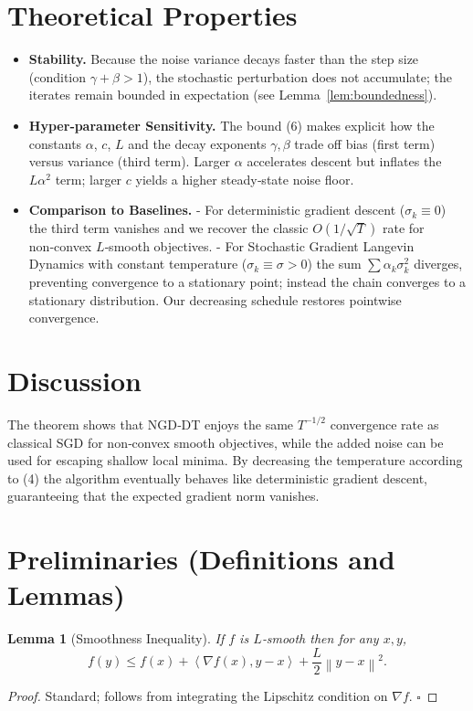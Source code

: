 \documentclass[11pt]{article}
\newtheorem{lemma}{Lemma}
\newcommand{\norm}[1]{\left\|#1\right\|}
\newcommand{\ip}[2]{\left\langle #1,#2\right\rangle}
\begin{document}
\section*{Theoretical Properties}
\begin{itemize}
\item \textbf{Stability.}  Because the noise variance decays faster than the
step size (condition $\gamma+\beta>1$), the stochastic perturbation
does not accumulate; the iterates remain bounded in expectation
(see Lemma~\ref{lem:boundedness}).

\item \textbf{Hyper‑parameter Sensitivity.}
  The bound (6) makes explicit how the constants $\alpha$, $c$, $L$ and
  the decay exponents $\gamma,\beta$ trade off bias (first term) versus
  variance (third term).  Larger $\alpha$ accelerates descent but
  inflates the $L\alpha^2$ term; larger $c$ yields a higher steady‑state
  noise floor.

\item \textbf{Comparison to Baselines.}
  - For deterministic gradient descent ($\sigma_k\equiv0$) the third term
    vanishes and we recover the classic $O(1/\sqrt{T})$ rate for
    non‑convex $L$‑smooth objectives.  
  - For Stochastic Gradient Langevin Dynamics with constant temperature
    ($\sigma_k\equiv\sigma>0$) the sum $\sum\alpha_k\sigma_k^2$ diverges,
    preventing convergence to a stationary point; instead the chain
    converges to a stationary distribution.  Our decreasing schedule
    restores pointwise convergence.

\end{itemize}

\section*{Discussion}
The theorem shows that NGD‑DT enjoys the same $T^{-1/2}$ convergence
rate as classical SGD for non‑convex smooth objectives, while the
added noise can be used for escaping shallow local minima.  By
decreasing the temperature according to (4) the algorithm eventually
behaves like deterministic gradient descent, guaranteeing that the
expected gradient norm vanishes.

\section*{Preliminaries (Definitions and Lemmas)}
\begin{lemma}[Smoothness Inequality]\label{lem:smooth}
If $f$ is $L$‑smooth then for any $x,y$,
\[
f(y)\le f(x)+\ip{\nabla f(x)}{y-x}+\frac{L}{2}\norm{y-x}^2 .
\tag{8}
\]
\end{lemma}
\begin{proof}
Standard; follows from integrating the Lipschitz condition on
$\nabla f$. \hfill $\square$
\end{proof}
\end{document}
